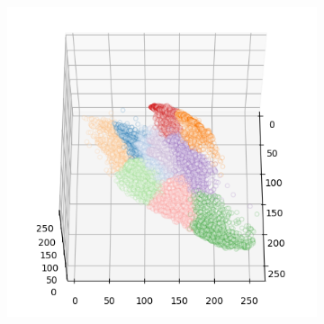 \begin{figure}[htbp]
\begin{subfigure}[t]{0.32\textwidth}
    \end{subfigure}
    \begin{subfigure}[t]{0.32\textwidth}
        \includegraphics[width=\linewidth]{../../python_code/plots/kmeans/flower-23/clusters_elev60_azim0.png}
    \end{subfigure}
\end{figure}

